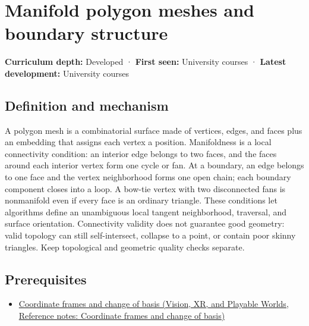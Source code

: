 \hypertarget{appendix-fab348609369}{}\label{referencestart:appendix-fab348609369}
\section{Manifold polygon meshes and boundary structure}\label{appendix-fab348609369-manifold-polygon-meshes-and-boundary-structure}

\hypertarget{appendix-fab348609369-manifold-polygon-meshes-and-boundary-structure}{}

\textbf{Curriculum depth:} Developed · \textbf{First seen:} University courses · \textbf{Latest development:} University courses

\begin{allmightroledefinition}

\subsection{Definition and mechanism}\label{appendix-fab348609369-definition-and-mechanism}

\hypertarget{appendix-fab348609369-definition-and-mechanism}{}

A polygon mesh is a combinatorial surface made of vertices, edges, and faces plus an embedding that assigns each vertex a position. Manifoldness is a local connectivity condition: an interior edge belongs to two faces, and the faces around each interior vertex form one cycle or fan. At a boundary, an edge belongs to one face and the vertex neighborhood forms one open chain; each boundary component closes into a loop. A bow-tie vertex with two disconnected fans is nonmanifold even if every face is an ordinary triangle. These conditions let algorithms define an unambiguous local tangent neighborhood, traversal, and surface orientation. Connectivity validity does not guarantee good geometry: valid topology can still self-intersect, collapse to a point, or contain poor skinny triangles. Keep topological and geometric quality checks separate.

\end{allmightroledefinition}

\subsection{Prerequisites}\label{appendix-fab348609369-prerequisites}

\hypertarget{appendix-fab348609369-prerequisites}{}

\begin{itemize}
\tightlist
\item
  \href{../07-Vision-XR-and-Playable-Worlds/main.pdf\#nameddest=appendix-1bae9457dbc3}{Coordinate frames and change of basis (Vision, XR, and Playable Worlds, Reference notes: Coordinate frames and change of basis)}
\end{itemize}

